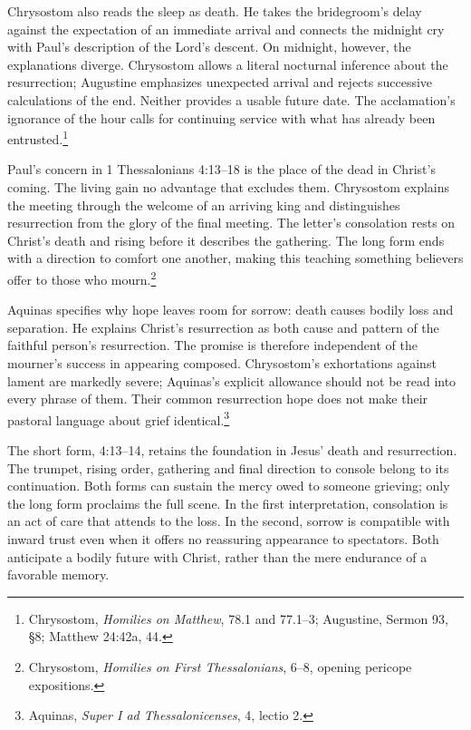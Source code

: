 Chrysostom also reads the sleep as death. He takes the bridegroom's delay against the expectation of an immediate arrival and connects the midnight cry with Paul's description of the Lord's descent. On midnight, however, the explanations diverge. Chrysostom allows a literal nocturnal inference about the resurrection; Augustine emphasizes unexpected arrival and rejects successive calculations of the end. Neither provides a usable future date. The acclamation's ignorance of the hour calls for continuing service with what has already been entrusted.\footnote{Chrysostom, \textit{Homilies on Matthew}, 78.1 and 77.1--3; Augustine, Sermon 93, §8; Matthew 24:42a, 44.}

Paul's concern in 1 Thessalonians 4:13--18 is the place of the dead in Christ's coming. The living gain no advantage that excludes them. Chrysostom explains the meeting through the welcome of an arriving king and distinguishes resurrection from the glory of the final meeting. The letter's consolation rests on Christ's death and rising before it describes the gathering. The long form ends with a direction to comfort one another, making this teaching something believers offer to those who mourn.\footnote{Chrysostom, \textit{Homilies on First Thessalonians}, 6--8, opening pericope expositions.}

Aquinas specifies why hope leaves room for sorrow: death causes bodily loss and separation. He explains Christ's resurrection as both cause and pattern of the faithful person's resurrection. The promise is therefore independent of the mourner's success in appearing composed. Chrysostom's exhortations against lament are markedly severe; Aquinas's explicit allowance should not be read into every phrase of them. Their common resurrection hope does not make their pastoral language about grief identical.\footnote{Aquinas, \textit{Super I ad Thessalonicenses}, 4, lectio 2.}

The short form, 4:13--14, retains the foundation in Jesus' death and resurrection. The trumpet, rising order, gathering and final direction to console belong to its continuation. Both forms can sustain the mercy owed to someone grieving; only the long form proclaims the full scene. In the first interpretation, consolation is an act of care that attends to the loss. In the second, sorrow is compatible with inward trust even when it offers no reassuring appearance to spectators. Both anticipate a bodily future with Christ, rather than the mere endurance of a favorable memory.

